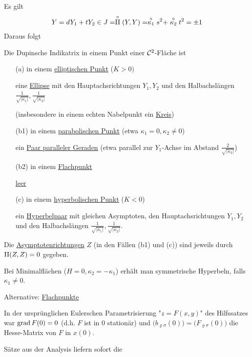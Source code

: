 Es gilt
\[
 Y = d Y_1 + t Y_2 \in J = \stackrel{\circ}{\Rom2}(Y,Y) = \stackrel \circ{\kappa_1}s^2 + \stackrel \circ{\kappa_2}t^2 = \pm 1
\]
Daraus folgt
\begin{satz}\label{satz235}
 Die Dupinsche Indikatrix in einem Punkt einer \(\mathcal{C}^2\)-Fläche ist
 \begin{enumerate}
  \item[(a)] in einem \uline{elliptischen Punkt} (\(K > 0)\) \par
  eine \uline{Ellipse} mit den Hauptachsrichtungen \(Y_1, Y_2\) und den Halbachslängen \(\frac{1}{\sqrt{|\kappa_1|}}, \frac{1}{\sqrt{|\kappa_2|}}\) \par
  (insbesondere in einem echten Nabelpunkt ein \uline{Kreis})
  \item[(b1)] in einem \uline{parabolischen Punkt} (etwa \(\kappa_1 = 0, \kappa_2 \ne 0\)) \par
  ein \uline{Paar paralleler Geraden} (etwa parallel zur \(Y_1\)-Achse im Abstand \(\frac{2}{\sqrt{|\kappa_2|}}\))
  \item[(b2)] in einem \uline{Flachpunkt} \par
  \uline{leer}
  \item[(c)] in einem \uline{hyperbolischen Punkt} (\(K < 0\)) \par
  ein \uline{Hyperbelpaar} mit gleichen Asymptoten, den Hauptachsrichtungen \(Y_1, Y_2\) und den Halbachslängen \(\frac{1}{\sqrt{|\kappa_1|}}, \frac{1}{\sqrt{|\kappa_2|}}\).
 \end{enumerate}
Die \uline{Asymptotenrichtungen} \(Z\) (in den Fällen (b1) und (c)) sind jeweils durch \(\Rom2(Z,Z) = 0\) gegeben.
\end{satz}

\begin{bemerkung}
 Bei Minimalflächen (\(H = 0, \kappa_2 = - \kappa_1\)) erhält man symmetrische Hyperbeln, falls \(\kappa_1 \ne 0\).\par
 Alternative: \uline{Flachpunkte}
\end{bemerkung}

In der ursprünglichen Eulerschen Parametrisierung "\(z = F(x,y)\)" des Hilfssatzes war \(\operatorname{grad} F(0) = 0\) (d.h. \(F\) ist  in \(0\) stationär) und \(\big(b_{\varrho \sigma}(0)\big) = \big(F_{\varrho \sigma}(0)\big)\) die Hesse-Matrix von \(F\) in \(x(0)\). \par

Sätze aus der Analysis liefern sofort die 

